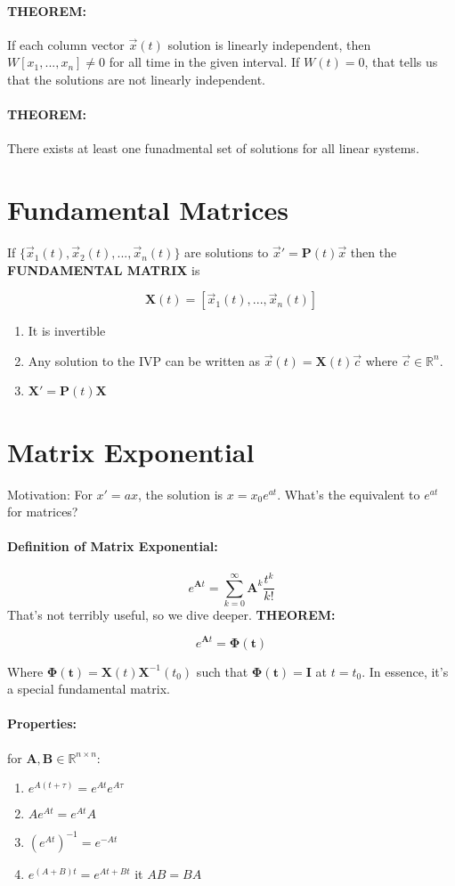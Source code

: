 \documentclass[a4paper,12pt]{report}
\begin{document}
\paragraph{THEOREM: } If each column vector $\vec{x}(t)$ solution is linearly independent, then $W[x_1, ..., x_n] \neq 0$ for all time in the 
given interval. If $W(t) = 0$, that tells us that the solutions are not linearly independent.

\paragraph{THEOREM: } There exists at least one funadmental set of solutions for all linear systems. 

\section{Fundamental Matrices}
If $\{\vec{x}_1(t), \vec{x}_2(t), ..., \vec{x}_n(t)\}$ are solutions to $\vec{x}' = \pmb{P}(t)\vec{x}$ then the \textbf{FUNDAMENTAL MATRIX} is 

$$\pmb{X}(t) = [\vec{x}_1(t), ..., \vec{x}_n(t)]$$
\begin{enumerate}
\item It is invertible
\item Any solution to the IVP can be written as $\vec{x}(t) = \pmb{X}(t)\vec{c}$ where $\vec{c} \in \mathbb{R}^n$. 
\item $\pmb{X}' = \pmb{P}(t)\pmb{X}$
\end{enumerate}

\section{Matrix Exponential}
Motivation: For $x' = ax$, the solution is $x = x_0 e^{at}$. What's the equivalent to $e^{at}$ for matrices? 
\paragraph{Definition of Matrix Exponential: } $$e^{\pmb{A}t} = \sum_{k=0}^{\infty}\pmb{A}^k\frac{t^k}{k!}$$
That's not terribly useful, so we dive deeper. \textbf{THEOREM: } 

$$e^{\pmb{A}t} = \pmb{\Phi(t)}$$

Where $\pmb{\Phi(t)} = \pmb{X}(t)\pmb{X}^{-1}(t_0)$ such that $\pmb{\Phi(t)} = \pmb{I}$ at $t = t_0$. In essence, it's a 
special fundamental matrix. 

\paragraph{Properties: } for $\pmb{A}, \pmb{B} \in \mathbb{R}^{n\times n}$:   
\begin{enumerate}
\item $e^{A(t + \tau)} = e^{At}e^{A\tau}$
\item $Ae^{At} = e^{At}A$
\item $(e^{At})^{-1} = e^{-At}$
\item $e^{(A+B)t} = e^{At + Bt}$ it $AB = BA$
\end{enumerate}
\end{document}
